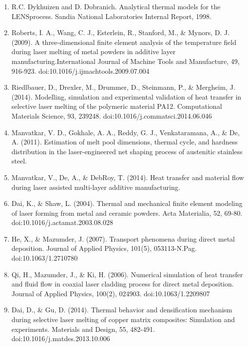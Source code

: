 \documentclass[10pt]{article}
\begin{document}
\begin{enumerate}
  \item R.C. Dykhuizen and D. Dobranich. Analytical thermal models for the LENSprocess. Sandia National Laboratories Internal Report, 1998.

  \item Roberts, I. A., Wang, C. J., Esterlein, R., Stanford, M., \& Mynors, D. J. (2009). A three-dimensional finite element analysis of the temperature field during laser melting of metal powders in additive layer manufacturing.International Journal of Machine Tools and Manufacture, 49, 916-923. doi:10.1016/j.ijmachtools.2009.07.004

  \item Riedlbauer, D., Drexler, M., Drummer, D., Steinmann, P., \& Mergheim, J. (2014). Modelling, simulation and experimental validation of heat transfer in selective laser melting of the polymeric material PA12. Computational Materials Science, 93, 239248. doi:10.1016/j.commatsci.2014.06.046

  \item Manvatkar, V. D., Gokhale, A. A., Reddy, G. J., Venkataramana, A., \& De, A. (2011). Estimation of melt pool dimensions, thermal cycle, and hardness distribution in the laser-engineered net shaping process of austenitic stainless steel.

  \item Manvatkar, V., De, A., \& DebRoy, T. (2014). Heat transfer and material flow during laser assisted multi-layer additive manufacturing.

  \item Dai, K., \& Shaw, L. (2004). Thermal and mechanical finite element modeling of laser forming from metal and ceramic powders. Acta Materialia, 52, 69-80. doi:10.1016/j.actamat.2003.08.028

  \item He, X., \& Mazumder, J. (2007). Transport phenomena during direct metal deposition. Journal of Applied Physics, 101(5), 053113-N.Pag. doi:10.1063/1.2710780

  \item Qi, H., Mazumder, J., \& Ki, H. (2006). Numerical simulation of heat transfer and fluid flow in coaxial laser cladding process for direct metal deposition. Journal of Applied Physics, 100(2), 024903. doi:10.1063/1.2209807

  \item Dai, D., \& Gu, D. (2014). Thermal behavior and densification mechanism during selective laser melting of copper matrix composites: Simulation and experiments. Materials and Design, 55, 482-491. doi:10.1016/j.matdes.2013.10.006


\end{enumerate}
\end{document}
